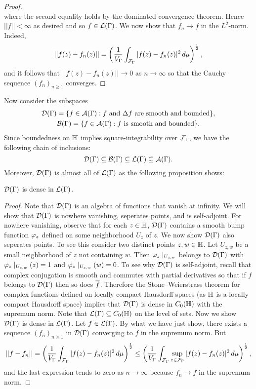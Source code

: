 \begin{proof}
\[        \]
        where the second equality holds by the dominated convergence theorem. Hence $||f|| < \infty$ as desired and so $f \in \mathcal{L}(\Gamma)$. We now show that $f_{n} \to f$ in the $L^{2}$-norm. Indeed,
        \[
          ||f(z)-f_{n}(z)|| = \left(\frac{1}{V_{\Gamma}}\int_{\mathcal{F}_{\Gamma}}|f(z)-f_{n}(z)|^{2}\,d\mu\right)^{\frac{1}{2}},
        \]
        and it follows that $||f(z)-f_{n}(z)|| \to 0$ as $n \to \infty$ so that the Cauchy sequence $(f_{n})_{n \ge 1}$ converges.
      \end{proof}

      Now consider the subspaces
      \begin{gather*}
        \mathcal{D}(\Gamma) = \{f \in \mathcal{A}(\Gamma):\text{$f$ and $\Delta f$ are smooth and bounded}\}, \\
        \mathcal{B}(\Gamma) = \{f \in \mathcal{A}(\Gamma):\text{$f$ is smooth and bounded}\}.
      \end{gather*}
      Since boundedness on $\mathbb{H}$ implies square-integrability over $\mathcal{F}_{\Gamma}$, we have the following chain of inclusions:
      \[
        \mathcal{D}(\Gamma) \subseteq \mathcal{B}(\Gamma) \subseteq \mathcal{L}(\Gamma) \subseteq \mathcal{A}(\Gamma).
      \]
      Moreover, $\mathcal{D}(\Gamma)$ is almost all of $\mathcal{L}(\Gamma)$ as the following proposition shows:

      \begin{proposition}\label{prop:dense_subspace_of_square-integrable_modular_functions}
        $\mathcal{D}(\Gamma)$ is dense in $\mathcal{L}(\Gamma)$.
      \end{proposition}
      \begin{proof}
        Note that $\mathcal{D}(\Gamma)$ is an algebra of functions that vanish at infinity. We will show that $\mathcal{D}(\Gamma)$ is nowhere vanishing, seperates points, and is self-adjoint. For nowhere vanishing, observe that for each $z \in \mathbb{H}$, $\mathcal{D}(\Gamma)$ contains a smooth bump function $\varphi_{z}$ defined on some neighborhood $U_{z}$ of $z$. We now show $\mathcal{D}(\Gamma)$ also seperates points. To see this consider two distinct points $z,w \in \mathbb{H}$. Let $U_{z,w}$ be a small neighborhood of $z$ not containing $w$. Then $\varphi_{z}\mid_{U_{z,w}}$ belongs to $\mathcal{D}(\Gamma)$ with $\varphi_{z}\mid_{U_{z,w}}(z) = 1$ and $\varphi_{z}\mid_{U_{z,w}}(w) = 0$. To see why $\mathcal{D}(\Gamma)$ is self-adjoint, recall that complex conjugation is smooth and commutes with partial derivatives so that if $f$ belongs to $\mathcal{D}(\Gamma)$ then so does $\overline{f}$. Therefore the Stone–Weierstrass theorem for complex functions defined on locally compact Hausdorff spaces (as $\mathbb{H}$ is a locally compact Hausdorff space) implies that $\mathcal{D}(\Gamma)$ is dense in $C_{0}(\mathbb{H})$ with the supremum norm. Note that $\mathcal{L}(\Gamma) \subseteq C_{0}(\mathbb{H})$ on the level of sets. Now we show $\mathcal{D}(\Gamma)$ is dense in $\mathcal{L}(\Gamma)$. Let $f \in \mathcal{L}(\Gamma)$. By what we have just show, there exists a sequence $(f_{n})_{n \ge 1}$ in $\mathcal{D}(\Gamma)$ converging to $f$ in the supremum norm. But 
        \[
        ||f-f_{n}|| = \left(\frac{1}{V_{\Gamma}}\int_{\mathcal{F}_{\Gamma}}|f(z)-f_{n}(z)|^{2}\,d\mu\right)^{\frac{1}{2}} \le \left(\frac{1}{V_{\Gamma}}\int_{\mathcal{F}_{\Gamma}}\sup_{z \in \mathcal{F}_{\Gamma}}|f(z)-f_{n}(z)|^{2}\,d\mu\right)^{\frac{1}{2}},
        \]
        and the last expression tends to zero as $n \to \infty$ because $f_{n} \to f$ in the supremum norm.
      \end{proof}

